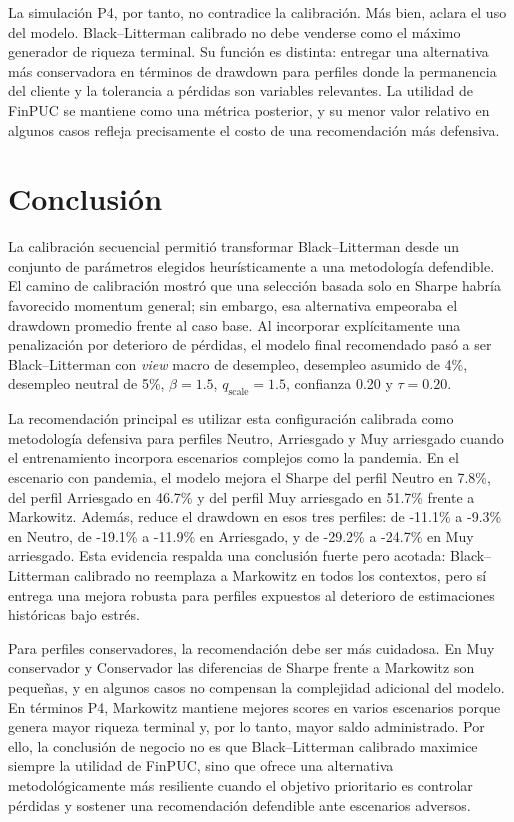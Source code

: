 \documentclass[11pt]{article}
\begin{document}
La simulaci\'on P4, por tanto, no contradice la calibraci\'on. M\'as bien, aclara el uso del modelo. Black--Litterman calibrado no debe venderse como el m\'aximo generador de riqueza terminal. Su funci\'on es distinta: entregar una alternativa m\'as conservadora en t\'erminos de drawdown para perfiles donde la permanencia del cliente y la tolerancia a p\'erdidas son variables relevantes. La utilidad de FinPUC se mantiene como una m\'etrica posterior, y su menor valor relativo en algunos casos refleja precisamente el costo de una recomendaci\'on m\'as defensiva.

\section{Conclusi\'on}

La calibraci\'on secuencial permiti\'o transformar Black--Litterman desde un conjunto de par\'ametros elegidos heur\'isticamente a una metodolog\'ia defendible. El camino de calibraci\'on mostr\'o que una selecci\'on basada solo en Sharpe habr\'ia favorecido momentum general; sin embargo, esa alternativa empeoraba el drawdown promedio frente al caso base. Al incorporar expl\'icitamente una penalizaci\'on por deterioro de p\'erdidas, el modelo final recomendado pas\'o a ser Black--Litterman con \textit{view} macro de desempleo, desempleo asumido de 4\%, desempleo neutral de 5\%, $\beta=1.5$, $q_{\text{scale}}=1.5$, confianza 0.20 y $\tau=0.20$.

La recomendaci\'on principal es utilizar esta configuraci\'on calibrada como metodolog\'ia defensiva para perfiles Neutro, Arriesgado y Muy arriesgado cuando el entrenamiento incorpora escenarios complejos como la pandemia. En el escenario con pandemia, el modelo mejora el Sharpe del perfil Neutro en 7.8\%, del perfil Arriesgado en 46.7\% y del perfil Muy arriesgado en 51.7\% frente a Markowitz. Adem\'as, reduce el drawdown en esos tres perfiles: de -11.1\% a -9.3\% en Neutro, de -19.1\% a -11.9\% en Arriesgado, y de -29.2\% a -24.7\% en Muy arriesgado. Esta evidencia respalda una conclusi\'on fuerte pero acotada: Black--Litterman calibrado no reemplaza a Markowitz en todos los contextos, pero s\'i entrega una mejora robusta para perfiles expuestos al deterioro de estimaciones hist\'oricas bajo estr\'es.

Para perfiles conservadores, la recomendaci\'on debe ser m\'as cuidadosa. En Muy conservador y Conservador las diferencias de Sharpe frente a Markowitz son peque\~nas, y en algunos casos no compensan la complejidad adicional del modelo. En t\'erminos P4, Markowitz mantiene mejores scores en varios escenarios porque genera mayor riqueza terminal y, por lo tanto, mayor saldo administrado. Por ello, la conclusi\'on de negocio no es que Black--Litterman calibrado maximice siempre la utilidad de FinPUC, sino que ofrece una alternativa metodol\'ogicamente m\'as resiliente cuando el objetivo prioritario es controlar p\'erdidas y sostener una recomendaci\'on defendible ante escenarios adversos.
\end{document}
